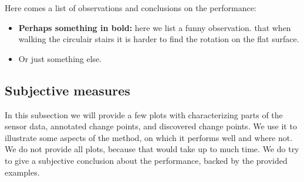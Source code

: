 
Here comes a list of observations and conclusions on the performance:
\begin{itemize}
  \item \textbf{Perhaps something in bold:} here we list a funny observation.
  \eg that when walking the circulair stairs it is harder to find the rotation on the flat surface.
  \item Or just something else.
\end{itemize}

\subsection{Subjective measures}
In this subsection we will provide a few plots with characterizing parts of the sensor data, annotated change points, and discovered change points.
We use it to illustrate some aspects of the method, on which it performs well and where not.
We do not provide all plots, because that would take up to much time.
We do try to give a subjective conclusion about the performance, backed by the provided examples.